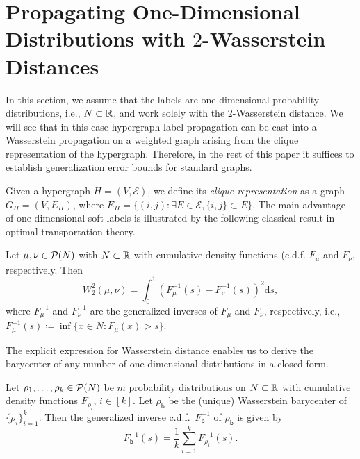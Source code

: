 \documentclass[letterpaper]{article} %
\begin{document}
\section{Propagating One-Dimensional Distributions with $2$-Wasserstein Distances}
In this section, we assume that the labels are one-dimensional probability distributions, i.e., $N\subset \R$, and work solely with the $2$-Wasserstein distance. We will see that in this case hypergraph label propagation can be cast into a Wasserstein propagation on a weighted graph arising from the clique representation of the hypergraph. Therefore, in the rest of this paper it suffices to establish generalization error bounds for standard graphs.

Given a hypergraph $H=(V, \mathcal E)$, we define its \textit{clique representation} as a graph $G_H=(V, E_H)$, where $E_H=\{(i, j):\exists E\in \mathcal E, \{i, j\}\subset E\}$. The main advantage of one-dimensional soft labels is illustrated by the following classical result in optimal transportation theory.
\begin{theorem}\label{Thm:Wasserstein_One}
Let $\mu, \nu\in \P(N)$ with $N\subset\R$ with cumulative density functions (c.d.f.\) $F_\mu$ and $F_\nu$, respectively. Then $$W_2^2(\mu, \nu)=\int_{0}^1\left(F_\mu^{-1}(s)-F_\nu^{-1}(s)\right)^2\text{d}s,$$
where $F_{\mu}^{-1}$ and $F_{\nu}^{-1}$ are the generalized inverses of $F_\mu$ and $F_\nu$, respectively, i.e., $F_\mu^{-1}(s)\coloneqq \inf\{x\in N:F_\mu(x)>s\}$. 
\end{theorem}
The explicit expression for Wasserstein distance enables us to derive the barycenter of any number of one-dimensional distributions in a closed form. 
\begin{theorem}
\label{Thm:Barycenter_One}
Let $\rho_1, \dots, \rho_k\in \P(N)$ be $m$ probability distributions on $N\subset\R$ with cumulative density functions $F_{\rho_i}$, $i\in [k]$. Let $\rho_{\mathsf{b}}$ be the (unique) Wasserstein barycenter of $\{\rho_i\}_{i=1}^k$. Then the generalized inverse c.d.f.\ $F^{-1}_{\mathsf{b}}$ of $\rho_{\mathsf{b}}$ is given by 
$$F^{-1}_{\mathsf{b}}(s)=\frac{1}{k}\sum_{i=1}^kF_{\rho_i}^{-1}(s).$$
\end{theorem}
\end{document}
